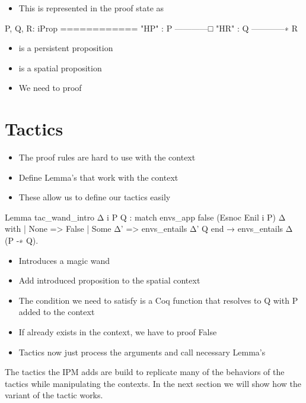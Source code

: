 \documentclass[thesis.tex]{subfiles}
\begin{document}
\begin{itemize}
  \item This is represented in the proof state as
\end{itemize}
\begin{coqcode}
  P, Q, R: iProp
  ============
  "HP" : P
  ------------□
  "HR" : Q
  ------------∗
  R
\end{coqcode}
\begin{itemize}
  \item {} is a persistent proposition
  \item {} is a spatial proposition
  \item We need to proof 
\end{itemize}

\section{Tactics}
\begin{itemize}
  \item The proof rules are hard to use with the context
  \item Define Lemma's that work with the context
  \item These allow us to define our tactics easily
\end{itemize}
\begin{coqcode}
  Lemma tac_wand_intro Δ i P Q :
    match envs_app false (Esnoc Enil i P) Δ with
    | None => False
    | Some Δ' => envs_entails Δ' Q
    end →
    envs_entails Δ (P -∗ Q).
\end{coqcode}
\begin{itemize}
  \item Introduces a magic wand
  \item Add introduced proposition to the spatial context
  \item The condition we need to satisfy is a Coq function that resolves to Q with P added to the context
  \item If  already exists in the context, we have to proof False
  \item Tactics now just process the arguments and call necessary Lemma's
\end{itemize}
The tactics the IPM adds are build to replicate many of the behaviors of the \coq tactics while manipulating the \iris contexts. In the next section we will show how the \iris variant of the  tactic works.
\end{document}
